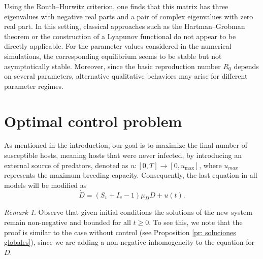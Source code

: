 \documentclass{amsart}
\theoremstyle{definition}
\theoremstyle{remark}
\newtheorem{rem}[thm]{Remark}
\numberwithin{equation}{section}
\begin{document}
Using the Routh--Hurwitz criterion, one finds that this matrix has three eigenvalues with negative real parts and a pair of complex eigenvalues with zero real part. In this setting, classical approaches such as the Hartman–Grobman theorem or the construction of a Lyapunov functional do not appear to be directly applicable. For the parameter values considered in the numerical simulations, the corresponding equilibrium seems to be stable but not asymptotically stable. Moreover, since the basic reproduction number $R_0$ depends on several parameters, alternative  qualitative behaviors may arise for different parameter regimes.

\section{Optimal control problem}\label{section 4}
		
As mentioned in the introduction, our goal is to maximize the final number of susceptible hosts, meaning hosts that were never infected, by introducing an external source of predators, denoted as $u:[0,T]\to [0,u_\text{max}]$, where $u_{max}$ represents the maximum breeding capacity. Consequently, the last equation in all models will be modified as 
$$\dot{D} = (S_v + I_v - 1)\mu_D D + u(t).$$
		
\begin{rem} \label{re: soluciones acotadas}
	Observe that given initial conditions the solutions of the new system remain non-negative and bounded for all $ t \geq 0 $. To see this, we note that the proof is similar to the case without control (see Proposition \ref{pr: soluciones globales}), since we are adding a non-negative inhomogeneity to the equation for $D$.
\end{rem}  		
	
\end{document}
